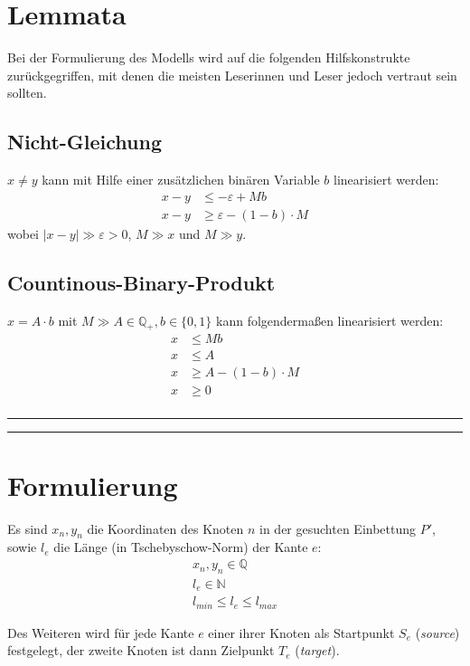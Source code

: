 \documentclass[a4paper,11pt]{amsart}
\begin{document}
\section*{Lemmata}

\noindent Bei der Formulierung des Modells wird auf die folgenden Hilfskonstrukte zurückgegriffen, mit denen die meisten Leserinnen und Leser jedoch vertraut sein sollten.

\subsection*{Nicht-Gleichung} $x \ne y$ kann mit Hilfe einer zusätzlichen binären Variable $b$ linearisiert werden:
\begin{align*}
x - y &\le - \varepsilon + M b\\
x - y &\ge \varepsilon - (1-b)\cdot M
\end{align*}
wobei $\left|x-y\right| \gg \varepsilon > 0$, $M \gg x$ und $M \gg y$.
\bigskip


\subsection*{Countinous-Binary-Produkt}$x = A \cdot b$ mit $M \gg A \in \mathbb{Q_+}, b \in \{0, 1\}$ kann folgendermaßen linearisiert werden:
\begin{align*}
x &\le M b\\
x &\le A\\
x &\ge A - (1-b) \cdot M\\
x &\ge 0\\
\end{align*}
\hrule
\hrule

\section*{Formulierung}

\noindent Es sind $x_n, y_n$ die Koordinaten des Knoten $n$ in der gesuchten Einbettung $P'$, sowie $l_e$ die Länge (in Tschebyschow-Norm) der Kante $e$:
\bigskip
\begin{gather*}
x_n, y_n \in \mathbb{Q}\\
l_e \in \mathbb{N} \\
l_{min} \le l_e \le l_{max}
\end{gather*}
\bigskip

\noindent Des Weiteren wird für jede Kante $e$ einer ihrer Knoten als Startpunkt $S_e$ (\textit{source}) festgelegt, der zweite Knoten ist dann Zielpunkt $T_e$ (\textit{target}).\\
\end{document}
